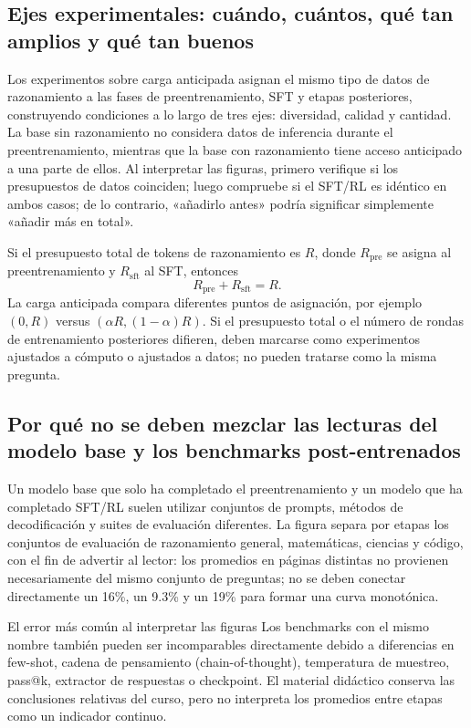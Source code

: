 \subsection{Ejes experimentales: cuándo, cuántos, qué tan amplios y qué tan buenos}

Los experimentos sobre carga anticipada asignan el mismo tipo de datos de razonamiento a las fases de preentrenamiento, SFT y etapas posteriores, construyendo condiciones a lo largo de tres ejes: diversidad, calidad y cantidad. La base sin razonamiento no considera datos de inferencia durante el preentrenamiento, mientras que la base con razonamiento tiene acceso anticipado a una parte de ellos. Al interpretar las figuras, primero verifique si los presupuestos de datos coinciden; luego compruebe si el SFT/RL es idéntico en ambos casos; de lo contrario, «añadirlo antes» podría significar simplemente «añadir más en total».


Si el presupuesto total de tokens de razonamiento es $R$, donde $R_{\mathrm{pre}}$ se asigna al preentrenamiento y $R_{\mathrm{sft}}$ al SFT, entonces
\[
R_{\mathrm{pre}}+R_{\mathrm{sft}}=R.
\]
La carga anticipada compara diferentes puntos de asignación, por ejemplo $(0,R)$ versus $(\alpha R,(1-\alpha)R)$. Si el presupuesto total o el número de rondas de entrenamiento posteriores difieren, deben marcarse como experimentos ajustados a cómputo o ajustados a datos; no pueden tratarse como la misma pregunta.

\subsection{Por qué no se deben mezclar las lecturas del modelo base y los benchmarks post-entrenados}

Un modelo base que solo ha completado el preentrenamiento y un modelo que ha completado SFT/RL suelen utilizar conjuntos de prompts, métodos de decodificación y suites de evaluación diferentes. La figura separa por etapas los conjuntos de evaluación de razonamiento general, matemáticas, ciencias y código, con el fin de advertir al lector: los promedios en páginas distintas no provienen necesariamente del mismo conjunto de preguntas; no se deben conectar directamente un 16\%, un 9.3\% y un 19\% para formar una curva monotónica.


\begin{warningbox}{El error más común al interpretar las figuras}
Los benchmarks con el mismo nombre también pueden ser incomparables directamente debido a diferencias en few-shot, cadena de pensamiento (chain-of-thought), temperatura de muestreo, pass@k, extractor de respuestas o checkpoint. El material didáctico conserva las conclusiones relativas del curso, pero no interpreta los promedios entre etapas como un indicador continuo.
\end{warningbox}

